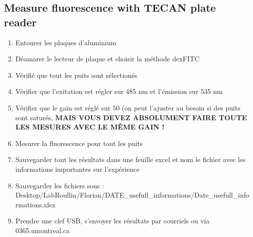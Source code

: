 \subsection{Measure fluorescence with TECAN plate reader}
\begin{enumerate}
\item Entourer les plaques d'aluminium
\item Déamarer le lecteur de plaque et choisir la méthode dexFITC
\item Vérifié que tout les puits sont sélectionés
\item Vérifier que l'exitation est régler sur 485 nm et l'émission sur 535 nm
\item Vérifier que le gain est réglé sur 50 (on peut l'ajuster au besoin si des puits sont saturés, \textbf{MAIS VOUS DEVEZ ABSOLUMENT FAIRE TOUTE LES MESURES AVEC LE MÊME GAIN !}
\item Mesurer la fluorescence pour tout les puits
\item Sauvegarder tout les résultats dans une feuille excel et nom le fichier avec les informations importantes sur l'expérience
\item Sauvegarder les fichiers sous :  \\ Desktop/LabRoullin/Florian/DATE\_usefull\_informations/Date\_usefull\_informations.xlsx
\item Prendre une clef USB, s'envoyer les résultats par courriels ou via 0365.umontreal.ca
\end{enumerate}
